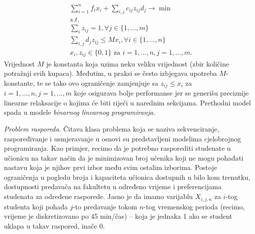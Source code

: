 \documentclass[a4paper, utf8, 11pt, colorlinks]{book}
\begin{document}
\begin{align*}
	&\sum_{i=1}^n f_i x_i  + \sum_{i,j} c_{ij} z_{ij} d_j \rightarrow \min\\
	& s.t. \nonumber \\
	& \sum_{i} z_{ij} = 1, \forall j\in\{1,\ldots,m\} \\
	& \sum_{i,j} d_j z_{ij} \leq M x_i, \forall i \in \{1,\ldots,n\} \\
	& x_i, z_{ij} \in \{0,1\} \mbox{ za } i = 1, \ldots, n, j = 1,  \ldots, m.
\end{align*}
Vrijednost $M$ je konstanta koja uzima neku veliku vrijednost (zbir količine potražnji svih kupaca). Međutim, u praksi se često izbjegava upotreba $M$-konstante, te se tako ovo ograničenje zamjenjuje sa $ z_{ij} \leq x_i$ 
za $ i = 1, \ldots, n, j = 1,  \ldots, m$ koje osigurava bolje performanse jer se generišu preciznije linearne relaksacije o kojima će biti riječi u narednim sekcijama. Prethodni model spada u modele \emph{binarnog linearnog programiranja}. 

\emph{Problem rasporeda}. Čitava klasa problema koja se naziva sekvenciranje, raspoređivanje i usmjeravanje u osnovi su predstavljeni modelima cjelobrojnog programiranja. Kao primjer, recimo da je potrebno rasporediti studenate u  učionicu na takav način
da je minimizovan broj učenika koji ne mogu pohađati nastavu koja je njihov prvi izbor među svim ostalim izborima. Postoje ograničenja u pogledu broja i kapaciteta učionica dostupnih u bilo kom trenutku, dostupnosti predavača na fakultetu u određeno vrijeme i preferencijama studenata za određene rasporede. Jasno je da imamo varijablu $X_{i,j,n}$ za   $i$-tog studenta 
koji pohađa $j$-to predavanje tokom $n$-tog vremenskog perioda (recimo, vrijeme je diskretizovano po 45 min/čas) -- koja je jednaka 1 ako se student uklapa u takav raspored, inače 0. 
\end{document}
